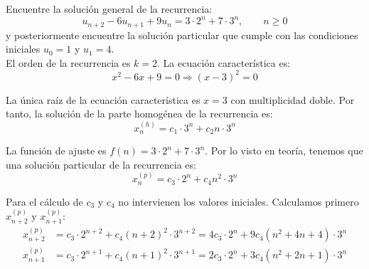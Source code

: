 \documentclass[12pt]{article}
\begin{document}
    \begin{ejercicio}[Recurrencia]
        Encuentre la solución general de la recurrencia:
        \begin{equation*}
            u_{n+2} - 6u_{n+1} + 9u_n = 3\cdot 2^n + 7\cdot 3^n,\qquad n\geq 0
        \end{equation*}
        y posteriormente encuentre la solución particular que cumple con las condiciones iniciales $u_0 = 1$ y $u_1 = 4$.\\
    
        El orden de la recurrencia es $k=2$. La ecuación característica es:
        \begin{equation*}
            x^2 - 6x + 9 = 0 \Longrightarrow (x-3)^2 = 0
        \end{equation*}

        La única raíz de la ecuación característica es $x=3$ con multiplicidad doble. Por tanto, la solución de la parte homogénea de la recurrencia es:
        \begin{equation*}
            x_n^{(h)} = c_1\cdot 3^n + c_2n\cdot 3^n
        \end{equation*}
    
        La función de ajuste es $f(n) = 3\cdot 2^n + 7\cdot 3^n$. Por lo visto en teoría, tenemos que
        una solución particular de la recurrencia es:
        \begin{equation*}
            x_n^{(p)} = c_3\cdot 2^n + c_4n^2\cdot 3^n
        \end{equation*}
    
        Para el cálculo de $c_3$ y $c_4$ no intervienen los valores iniciales.
        Calculamos primero $x_{n+2}^{(p)}$ y $x_{n+1}^{(p)}$:
        \begin{align*}
            x_{n+2}^{(p)} &= c_3\cdot 2^{n+2} + c_4(n+2)^2\cdot 3^{n+2} = 4c_3\cdot 2^n + 9c_4(n^2+4n+4)\cdot 3^{n} \\
            x_{n+1}^{(p)} &= c_3\cdot 2^{n+1} + c_4(n+1)^2\cdot 3^{n+1} = 2c_3\cdot 2^n + 3c_4(n^2+2n+1)\cdot 3^{n}
        \end{align*}
    

\end{ejercicio}
\end{document}
